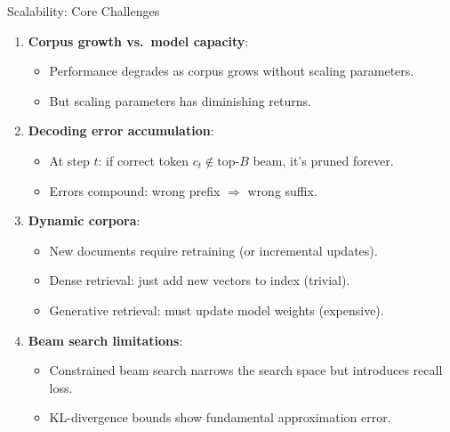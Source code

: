 \documentclass[aspectratio=169,11pt]{beamer}
\begin{document}
\begin{frame}{Scalability: Core Challenges}
\begin{enumerate}
    \item \textbf{Corpus growth vs.\ model capacity}:
    \begin{itemize}
        \item Performance degrades as corpus grows without scaling parameters.
        \item But scaling parameters has diminishing returns.
    \end{itemize}

    \vspace{0.2cm}
    \item \textbf{Decoding error accumulation}:
    \begin{itemize}
        \item At step $t$: if correct token $c_t \notin \text{top-}B$ beam, it's pruned forever.
        \item Errors compound: wrong prefix $\Rightarrow$ wrong suffix.
    \end{itemize}

    \vspace{0.2cm}
    \item \textbf{Dynamic corpora}:
    \begin{itemize}
        \item New documents require retraining (or incremental updates).
        \item Dense retrieval: just add new vectors to index (trivial).
        \item Generative retrieval: must update model weights (expensive).
    \end{itemize}

    \vspace{0.2cm}
    \item \textbf{Beam search limitations}:
    \begin{itemize}
        \item Constrained beam search narrows the search space but introduces recall loss.
        \item KL-divergence bounds show fundamental approximation error.
    \end{itemize}
\end{enumerate}
\end{frame}

\end{document}
